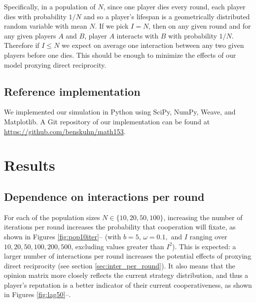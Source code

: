 \documentclass{amsart}
\newcommand{\om}{\omega}
\begin{document}
Specifically, in a population of $N$, since one player dies every
round, each player dies with probability $1/N$ and so a player's
lifespan is a geometrically distributed random variable with mean
$N$. If we pick $I=N$, then on any given round and for any given
players $A$ and $B$, player $A$ interacts with $B$ with probability
$1/N$. Therefore if $I\le N$ we expect on average one interaction
between any two given players before one dies. This should be enough
to minimize the effects of our model proxying direct reciprocity.

\subsection{Reference implementation}
\label{sec:implementation}

We implemented our simulation in Python using SciPy, NumPy, Weave, and
Matplotlib. A Git repository of our implementation can be found at
\url{https://github.com/benskuhn/math153}.

\section{Results}
\label{sec:results}

\subsection{Dependence on interactions per round}

For each of the population sizes $N \in \{10,20,50,100\}$, increasing
the number of iterations per round increases the probability that
cooperation will fixate, as shown in Figures
\ref{fig:pop10iter}-- (with $b=5$, $\om=0.1,$
and $I$ ranging over $10,20,50,100,200,500$, excluding values greater
than $I^2$). This is expected: a larger number of interactions per
round increases the potential effects of proxying direct reciprocity
(see section \ref{sec:inter_per_round}). It also means that the
opinion matrix more closely reflects the current strategy
distribution, and thus a player's reputation is a better indicator of
their current cooperativeness, as shown in Figures
\ref{fig:lag50}--.
\end{document}
